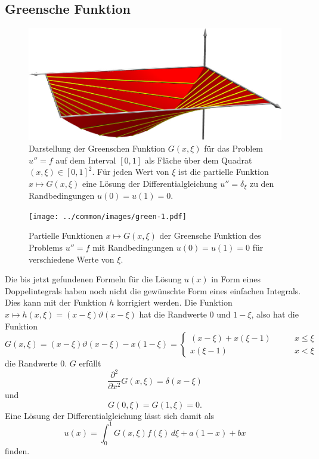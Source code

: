 \subsection{Greensche Funktion}
\begin{figure}
\begin{center}
\includegraphics[width=\hsize]{../common/3d/green.jpg}
\end{center}
\caption{Darstellung der Greenschen Funktion $G(x,\xi)$
für das Problem $u''=f$ auf
dem Interval $[0,1]$ als Fläche über dem Quadrat $(x,\xi)\in[0,1]^2$.
Für jeden Wert von $\xi$ ist die partielle Funktion $x\mapsto G(x,\xi)$
eine Lösung der Differentialgleichung $u''=\delta_\xi$ zu den Randbedingungen
$u(0)=u(1)=0$.
\label{elliptisch:green3dflaeche}}
\end{figure}
\begin{figure}
\begin{center}
\texttt{[image: ../common/images/green-1.pdf]}
\end{center}
\caption{Partielle Funktionen $x\mapsto G(x,\xi)$ der Greensche Funktion
des Problems $u''=f$ mit Randbedingungen $u(0)=u(1)=0$ für
verschiedene Werte von $\xi$.
\label{elliptisch:green1schar}}
\end{figure}

Die bis jetzt gefundenen Formeln für die Lösung $u(x)$
in Form eines Doppelintegrals haben noch
nicht die gewünschte Form eines einfachen Integrals.
Dies kann mit der Funktion $h$ korrigiert werden.
Die Funktion $x\mapsto h(x,\xi)=(x-\xi)\vartheta(x-\xi)$ hat die Randwerte
$0$ und $1-\xi$, also hat die Funktion
\[
G(x,\xi)
=
(x-\xi)\vartheta(x-\xi)-x(1-\xi)
=\begin{cases}
(x-\xi)+x(\xi-1)&\qquad x\le \xi \\
x(\xi-1)&\qquad x<\xi
\end{cases}
\]
die Randwerte $0$.
$G$ erfüllt
\[
\frac{\partial^2}{\partial x^2}G(x,\xi)=\delta(x-\xi)
\]
und
\[
G(0,\xi)=G(1,\xi)=0.
\]
Eine Lösung der Differentialgleichung lässt sich damit
als 
\[
u(x)=\int_0^1G(x,\xi)f(\xi)\,d\xi+a(1-x)+bx
\]
finden.


